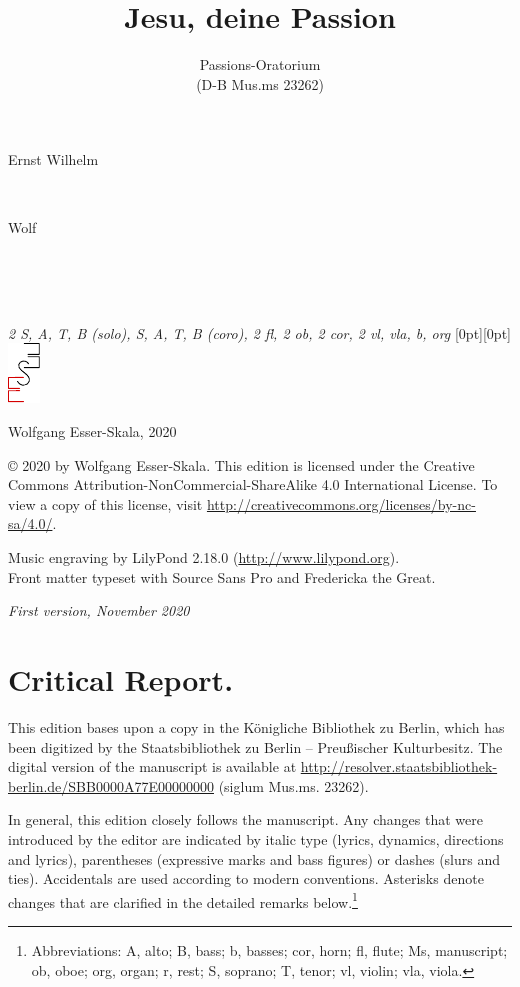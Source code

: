 \documentclass[parskip=full]{scrreprt}
\makeatletter
\DeclareRobustCommand{\sbseries}{\fontseries{sb}\selectfont}
\newcommand\fancytitlehead{
	\headingfont%
	\fontsize{80}{80}\selectfont\textcolor{black!80}{\@ifundefined{@shortname}{\@lastname}{\@shortname}.}\\[15pt]%
	\fontsize{55}{55}\selectfont\@ifundefined{@shorttitle}{\@title}{\@shorttitle}.%
}
\def\firstname#1{\def\@firstname{#1}}
\def\lastname#1{\def\@lastname{#1}}
\def\instrumentation#1{\def\@instrumentation{#1}}
\def\maketitle{%
\begin{titlepage}%
	\Large%
	{\@titlehead}%
	\vfill%
	{\strut\@firstname}\\%
	{\sbseries\color{oldred}\strut\@lastname}\\%
	{\strut\@namesuffix}%
	\vfill%
	{\sbseries\@title}\\%
	{\@subtitle}\\[\baselineskip]%
	{\itshape\@instrumentation}%
	\vfill%
	{\itshape\@parts}\hspace*{\fill}\raisebox{0pt}[0pt][0pt]{\includegraphics{ees_logo}}%
\end{titlepage}%
}
\newif\ifprintreport\printreportfalse
\makeatother
\begin{document}
\frenchspacing

\titlehead{\fancytitlehead}
\firstname{Ernst Wilhelm}
\lastname{Wolf}
\title{Jesu, deine Passion}
\subtitle{Passions-Oratorium\\(D-B Mus.ms 23262)}
\instrumentation{2 S, A, T, B (solo), S, A, T, B (coro), 2 fl, 2 ob, 2 cor, 2 vl, vla, b, org}
\maketitle


\thispagestyle{empty}

\vspace*{\fill}

\hspace*{1em}Wolfgang Esser-Skala, 2020

© 2020 by Wolfgang Esser-Skala. This edition is licensed under the Creative Commons Attribution-NonCommercial-ShareAlike 4.0 International License. To view a copy of this license, visit \url{http://creativecommons.org/licenses/by-nc-sa/4.0/}.

Music engraving by LilyPond 2.18.0 (\url{http://www.lilypond.org}).\\
Front matter typeset with Source Sans Pro and Fredericka the Great.

\textit{First version, November 2020}

\vspace*{2cm}

\ifprintreport
\chapter*{Critical Report.}

This edition bases upon a copy in the Königliche Bibliothek zu Berlin, which has been digitized by the Staatsbibliothek zu Berlin – Preußischer Kulturbesitz. The digital version of the manuscript is available at \url{http://resolver.staatsbibliothek-berlin.de/SBB0000A77E00000000} (siglum Mus.ms. 23262).

In general, this edition closely follows the manuscript. Any changes that were introduced by the editor are indicated by italic type (lyrics, dynamics, directions and lyrics), parentheses (expressive marks and bass figures) or dashes (slurs and ties). Accidentals are used according to modern conventions. Asterisks denote changes that are clarified in the detailed remarks below.\footnote{Abbreviations: A, alto; B, bass; b, basses; cor, horn; fl, flute; Ms, manuscript; ob, oboe; org, organ; r, rest; S, soprano; T, tenor; vl, violin; vla, viola.}
\end{document}
